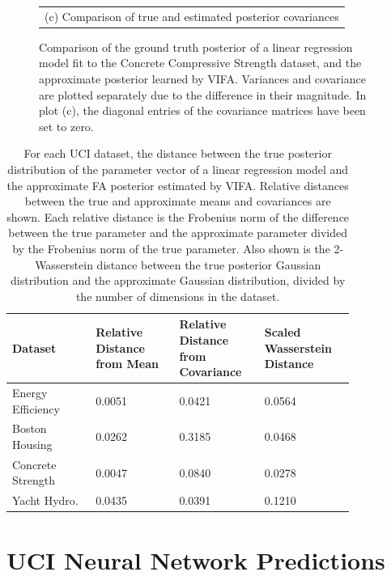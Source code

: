\documentclass[msc,deptreport.inf]{infthesis} %
\begin{document}
\begin{figure}[!htbp]
\begin{tabular}{c}
		(c) Comparison of true and estimated posterior covariances \\[6pt] 
	\end{tabular}
	\caption{Comparison of the ground truth posterior of a linear regression model fit to the Concrete Compressive Strength dataset, and the approximate posterior learned by VIFA. Variances and covariance are plotted separately due to the difference in their magnitude. In plot (c), the diagonal entries of the covariance matrices have been set to zero.}
	\label{fig:posterior_concrete_strength}
\end{figure} 

\begin{table}[h!]
	\begin{center}
		\begin{tabular}{|| p{0.21\linewidth} p{0.21\linewidth} p{0.21\linewidth} p{0.21\linewidth} ||} 
 			\hline
 			Dataset & Relative Distance from Mean & Relative Distance from Covariance & Scaled Wasserstein Distance \\ [0.5ex] 
 			\hline\hline
			Energy Efficiency 	& 0.0051 	& 0.0421 & 0.0564 \\ 
			\hline
			Boston Housing 	& 0.0262 	& 0.3185 & 0.0468 \\ 
			\hline
			Concrete Strength 	& 0.0047 	& 0.0840 & 0.0278 \\ 
			\hline
 			Yacht Hydro. 		& 0.0435 	& 0.0391 & 0.1210 \\ [1ex] 
			\hline
		\end{tabular}
		\caption{For each UCI dataset, the distance between the true posterior distribution of the parameter vector of a linear regression model and the approximate FA posterior estimated by VIFA. Relative distances between the true and approximate means and covariances are shown. Each relative distance is the Frobenius norm of the difference between the true parameter and the approximate parameter divided by the Frobenius norm of the true parameter. Also shown is the 2-Wasserstein distance between the true posterior Gaussian distribution and the approximate Gaussian distribution, divided by the number of dimensions in the dataset.}
		\label{table:linear_regression_vi_posterior_uci}
	\end{center}
\end{table}

\section{UCI Neural Network Predictions}\label{app:uci_nn_predictions}
\end{document}
